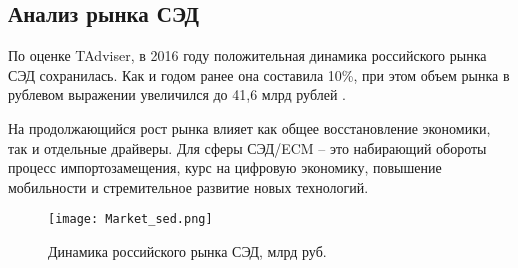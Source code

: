\subsection{Анализ рынка СЭД}
\label{sec:analysis:sed_market}

По оценке TAdviser, в 2016 году положительная динамика российского рынка СЭД сохранилась. Как и годом ранее она составила 10\%, при этом объем рынка в рублевом выражении увеличился до 41,6 млрд рублей \cite{tadviser_market1}.

На продолжающийся рост рынка влияет как общее восстановление экономики, так и отдельные драйверы. Для сферы СЭД/ECM – это набирающий обороты процесс импортозамещения, курс на цифровую экономику, повышение мобильности и стремительное развитие новых технологий.

\begin{figure}[h!]
\centering
	\texttt{[image: Market\_sed.png]}
	\caption{Динамика российского рынка СЭД, млрд руб.}
\end{figure}
